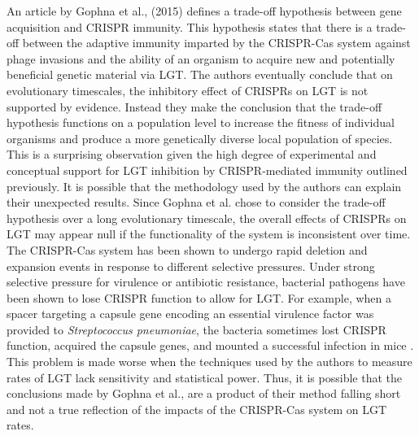 \documentclass[english]{article}
\begin{document}
An article by Gophna et al., (2015) defines a trade-off hypothesis
between gene acquisition and CRISPR immunity. This hypothesis states
that there is a trade-off between the adaptive immunity imparted by
the CRISPR-Cas system against phage invasions and the ability of an
organism to acquire new and potentially beneficial genetic material
via LGT. The authors eventually conclude that on evolutionary
timescales, the inhibitory effect of CRISPRs on LGT is not supported
by evidence. Instead they make the conclusion that the trade-off
hypothesis functions on a population level to increase the fitness of
individual organisms and produce a more genetically diverse local
population of species. This is a surprising observation given the high
degree of experimental and conceptual support for LGT inhibition by
CRISPR-mediated immunity outlined previously. It is possible that the
methodology used by the authors can explain their unexpected results.
Since Gophna et al. chose to consider the trade-off hypothesis over a
long evolutionary timescale, the overall effects of CRISPRs on LGT may
appear null if the functionality of the system is inconsistent over
time. The CRISPR-Cas system has been shown to undergo rapid deletion
and expansion events in response to different selective pressures.
Under strong selective pressure for virulence or antibiotic
resistance, bacterial pathogens have been shown to lose CRISPR
function to allow for LGT. For example, when a spacer targeting a
capsule gene encoding an essential virulence factor was provided to
\textit{Streptococcus pneumoniae}, the bacteria sometimes lost CRISPR function,
acquired the capsule genes, and mounted a successful infection in
mice \citep{Bika:12}.
This problem is made worse when the techniques used by the
authors to measure rates of LGT lack sensitivity and statistical
power. Thus, it is possible that the conclusions made by Gophna et
al., are a product of their method falling short and not a true
reflection of the impacts of the CRISPR-Cas system on LGT rates. 
\end{document}
